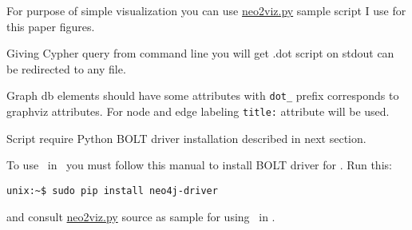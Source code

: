 \secdown 
{}

For purpose of simple visualization you can use
\href{https://github.com/ponyatov/article/raw/master/neo2viz.py}{neo2viz.py}
sample script I use for this paper figures.

Giving Cypher query from command line you will get .dot script on stdout can be
 redirected to any file.
 
Graph db elements should have some attributes with \verb|dot_| prefix
corresponds to graphviz attributes.
For node and edge labeling \verb|title:| attribute will be used.

Script require Python BOLT driver installation described in next section.


To use \neo\ in \py\ you must follow this manual to install BOLT driver for
\py. Run this:

\begin{verbatim}
unix:~$ sudo pip install neo4j-driver
\end{verbatim}

and consult
\href{https://github.com/ponyatov/article/raw/master/neo2viz.py}{neo2viz.py}
source as sample for using \neo\ in \py.

\secup